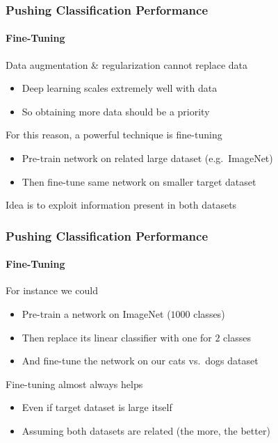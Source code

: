 \documentclass[xetex,professionalfont]{beamer}
\renewcommand\emph[1]{\textcolor{tuwcvl_cvl_blue}{#1}}
\begin{document}
\begin{frame}
	\frametitle{Pushing Classification Performance}
	\framesubtitle{Fine-Tuning}

	Data augmentation \& regularization cannot replace data
	\begin{itemize}
		\item Deep learning scales extremely well with data
		\item So obtaining more data should be a priority
	\end{itemize}

	\bigskip

	For this reason, a powerful technique is \emph{fine-tuning}
	\begin{itemize}
		\item \emph{Pre-train} network on related large dataset (e.g.~ImageNet)
		\item Then fine-tune same network on smaller target dataset
	\end{itemize}

	\bigskip

	Idea is to exploit information present in both datasets


\end{frame}



\begin{frame}
	\frametitle{Pushing Classification Performance}
	\framesubtitle{Fine-Tuning}

	For instance we could
	\begin{itemize}
		\item Pre-train a network on ImageNet ($1000$ classes)
		\item Then replace its linear classifier with one for $2$ classes
		\item And fine-tune the network on our cats vs.~dogs dataset
	\end{itemize}

	\bigskip

	Fine-tuning almost always helps
	\begin{itemize}
		\item Even if target dataset is large itself %
		\item Assuming both datasets are related (the more, the better)
	\end{itemize}

\end{frame}
\end{document}

